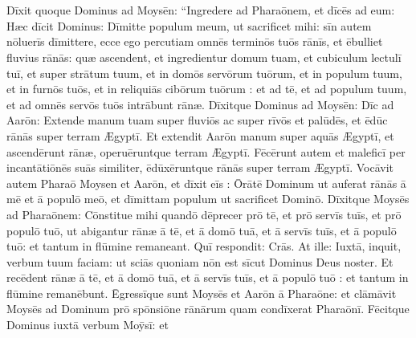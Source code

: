 \chapter{}


\thispagestyle{empty}
Dīxit quoque Dominus ad Moysēn: ``Ingredere ad Pharaōnem, et dīcēs ad eum: Hæc dīcit
Dominus: Dīmitte populum meum, ut sacrificet mihi:  sīn
autem nōluerīs dīmittere, ecce ego percutiam omnēs terminōs
tuōs rānīs,  et ēbulliet fluvius
rānās: quæ ascendent, et ingredientur domum tuam, et cubiculum lectulī tuī, et super strātum
tuum, et in domōs servōrum tuōrum, et in populum tuum, et in
furnōs tuōs, et in reliquiās cibōrum tuōrum
:  et ad tē, et ad populum tuum, et ad omnēs servōs tuōs intrābunt
rānæ.  Dīxitque Dominus ad Moysēn: Dīc ad
Aarōn: Extende manum tuam super fluviōs ac super rīvōs et
palūdēs, et ēdūc rānās super terram Ægyptī.
 Et extendit Aarōn manum super aquās Ægyptī, et ascendērunt
rānæ, operuēruntque terram Ægyptī.  Fēcērunt autem et
maleficī per incantātiōnēs suās similiter,
ēdūxēruntque rānās super terram Ægyptī.  Vocāvit autem
Pharaō Moysen et Aarōn, et dīxit eīs :
Ōrātē Dominum ut auferat rānās ā mē et ā populō meō, et
dīmittam populum ut sacrificet Dominō.  Dīxitque
Moysēs ad Pharaōnem: Cōnstitue mihi quandō
dēprecer prō tē, et prō servīs tuīs, et prō populō tuō, ut
abigantur rānæ ā tē, et ā domō tuā, et ā
servīs tuīs, et ā populō tuō: et tantum in flūmine remaneant.  Quī
respondit: Crās. At ille: Iuxtā, inquit, verbum tuum faciam: ut sciās
quoniam nōn est sīcut Dominus Deus noster.  Et recēdent
rānæ ā tē, et ā domō tuā, et ā servīs tuīs, et ā populō tuō
: et tantum in flūmine remanēbunt.  Ēgressīque sunt
Moysēs et Aarōn ā Pharaōne: et clāmāvit
Moysēs ad Dominum prō spōnsiōne
rānārum quam condīxerat
Pharaōnī.  Fēcitque Dominus iuxtā verbum Moȳsī: et
